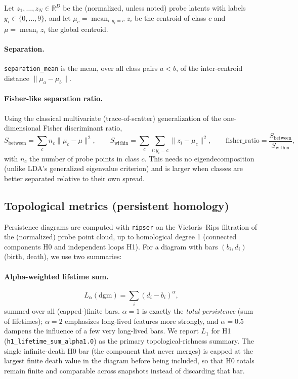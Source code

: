 \documentclass[11pt]{article}
\begin{document}
Let $z_1,\dots,z_N \in \mathbb{R}^D$ be the (normalized, unless noted) probe
latents with labels $y_i \in \{0,\dots,9\}$, and let $\mu_c =
\operatorname{mean}_{i: y_i = c} z_i$ be the centroid of class $c$ and
$\mu = \operatorname{mean}_i z_i$ the global centroid.

\paragraph{Separation.} \texttt{separation\_mean} is the mean, over all
class pairs $a<b$, of the inter-centroid distance $\lVert \mu_a - \mu_b
\rVert$.

\paragraph{Fisher-like separation ratio.} Using the classical
multivariate (trace-of-scatter) generalization of the one-dimensional Fisher
discriminant ratio,
\[
  S_{\text{between}} = \sum_c n_c \lVert \mu_c - \mu \rVert^2 , \qquad
  S_{\text{within}} = \sum_c \sum_{i: y_i = c} \lVert z_i - \mu_c \rVert^2 ,
  \qquad
  \text{fisher\_ratio} = \frac{S_{\text{between}}}{S_{\text{within}}} ,
\]
with $n_c$ the number of probe points in class $c$. This needs no
eigendecomposition (unlike LDA's generalized eigenvalue criterion) and is
larger when classes are better separated relative to their own spread.

\subsection{Topological metrics (persistent homology)}

Persistence diagrams are computed with \texttt{ripser} on the Vietoris--Rips
filtration of the (normalized) probe point cloud, up to homological degree 1
(connected components H0 and independent loops H1). For a diagram with bars
$(b_i,d_i)$ (birth, death), we use two summaries:

\paragraph{Alpha-weighted lifetime sum.}
\[
  L_\alpha(\text{dgm}) = \sum_i (d_i - b_i)^\alpha ,
\]
summed over all (capped-)finite bars. $\alpha{=}1$ is exactly the \emph{total
persistence} (sum of lifetimes); $\alpha{=}2$ emphasizes long-lived
features more strongly, and $\alpha{=}0.5$ dampens the influence of a few
very long-lived bars. We report $L_1$ for H1 (\texttt{h1\_lifetime\_sum\_alpha1.0})
as the primary topological-richness summary. The single infinite-death H0
bar (the component that never merges) is capped at the largest finite death
value in the diagram before being included, so that H0 totals remain finite
and comparable across snapshots instead of discarding that bar.
\end{document}
